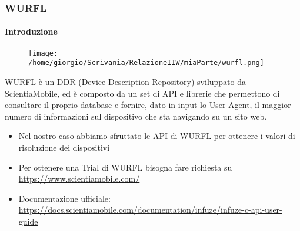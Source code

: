 \documentclass{beamer}
\begin{document}
\begin{frame}
\frametitle{WURFL}
\framesubtitle{Introduzione}

\begin{figure}
    \texttt{[image: /home/giorgio/Scrivania/RelazioneIIW/miaParte/wurfl.png]}
\end{figure}

WURFL è un DDR (Device Description Repository) sviluppato da ScientiaMobile, ed è composto da un set di API e librerie che permettono di consultare il proprio database e fornire, dato in input lo User Agent, il maggior
numero di informazioni sul dispositivo che sta navigando su un sito web.

\begin{itemize}
\item Nel nostro caso abbiamo sfruttato le API di WURFL per ottenere i valori di risoluzione dei dispositivi
\item Per ottenere una Trial di WURFL bisogna fare richiesta su \href{https://www.scientiamobile.com/}{\color{blue}  https://www.scientiamobile.com/}
\item Documentazione ufficiale: \href{https://docs.scientiamobile.com/documentation/infuze/infuze-c-api-user-guide}{\color{blue}  https://docs.scientiamobile.com/documentation/infuze/infuze-c-api-user-guide}

\end{itemize}
\end{frame}
\end{document}
